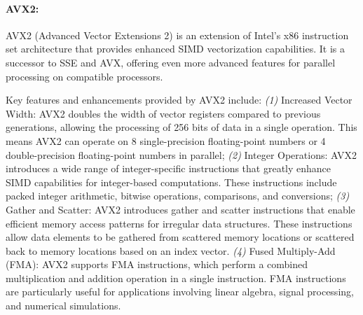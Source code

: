\paragraph{AVX2:}
AVX2 (Advanced Vector Extensions 2) is an extension of Intel's x86 instruction
set architecture that provides enhanced SIMD vectorization capabilities. It is
a successor to SSE and AVX, offering even more advanced features for parallel
processing on compatible processors.

Key features and enhancements provided by AVX2 include:
\emph{(1)} Increased Vector Width: AVX2 doubles the width of vector registers
compared to previous generations, allowing the processing of 256 bits of data
in a single operation. This means AVX2 can operate on 8 single-precision
floating-point numbers or 4 double-precision floating-point numbers in
parallel;
\emph{(2)} Integer Operations: AVX2 introduces a wide range of integer-specific
instructions that greatly enhance SIMD capabilities for integer-based
computations. These instructions include packed integer arithmetic, bitwise
operations, comparisons, and conversions;
\emph{(3)} Gather and Scatter: AVX2 introduces gather and scatter instructions
that enable efficient memory access patterns for irregular data structures.
These instructions allow data elements to be gathered from scattered memory
locations or scattered back to memory locations based on an index vector.
\emph{(4)} Fused Multiply-Add (FMA): AVX2 supports FMA instructions, which
perform a combined multiplication and addition operation in a single
instruction. FMA instructions are particularly useful for applications
involving linear algebra, signal processing, and numerical simulations.

